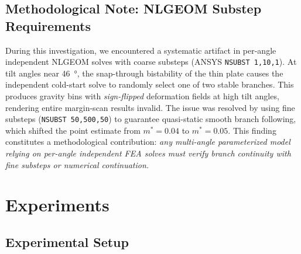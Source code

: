 \documentclass{CVM}
\begin{document}
\subsection{Methodological Note: NLGEOM Substep Requirements}
\label{sec:substep}

During this investigation, we encountered a systematic artifact in per-angle
independent NLGEOM solves with coarse substeps (ANSYS \verb|NSUBST 1,10,1|).
At tilt angles near \SI{46}{\degree}, the snap-through bistability of the thin
plate causes the independent cold-start solve to randomly select one of two
stable branches. This produces gravity bins with \emph{sign-flipped}
deformation fields at high tilt angles, rendering entire margin-scan results
invalid. The issue was resolved by using fine substeps
(\verb|NSUBST 50,500,50|) to guarantee quasi-static smooth branch following,
which shifted the point estimate from $m^*{=}0.04$ to $m^*{=}0.05$. This
finding constitutes a methodological contribution: \emph{any multi-angle
parameterized model relying on per-angle independent FEA solves must verify
branch continuity with fine substeps or numerical continuation.}

\section{Experiments}
\label{sec:experiments}

\subsection{Experimental Setup}
\end{document}
